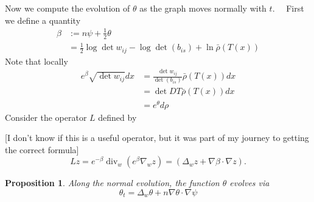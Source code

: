 \documentclass[12pt,letterpaper]{amsart}%
\newcounter{mycounter}
\numberwithin{mycounter}{section}
\theoremstyle{plain}
\newtheorem{proposition}[mycounter]{Proposition}
\numberwithin{equation}{section}
\theoremstyle{definition}
\newcommand{\note}[1]{\strut{\color{red}[#1]}}
\begin{document}
Now we compute the evolution of $\theta$ as the graph moves normally with $t$. \ \ First we define a quantity
\begin{align*}
\beta & :=n\psi+\frac{1}{2}\theta\\
& =\frac{1}{2}\log\det w_{ij}-\log\det(b_{is})+\ln\bar{\rho}(T(x))
\end{align*}
Note that locally
\begin{align*}
e^{\beta}\sqrt{\det w_{ij}}dx &  =\frac{\det w_{ij}}{\det(b_{is})}\bar{\rho
}(T(x))dx\\
&  =\det DT\bar{\rho}(T(x))dx\\
&  =e^{\theta}d\rho
\end{align*}
Consider the operator $L$ defined by \note{I don't know if this is a useful operator, but it was part of my journey to getting the correct formula}
\[
Lz=e^{-\beta}\operatorname{div}_{w}(e^{\beta}\nabla_{w}z)=\left(  \Delta
_{w}z+\nabla\beta\cdot\nabla z\right)  .
\]


\begin{proposition}
Along the normal evolution, the function $\theta$ evolves via
\[
\theta_{t}=\Delta_{w}\theta+n\nabla\theta\cdot\nabla\psi
\]

\end{proposition}
\end{document}
